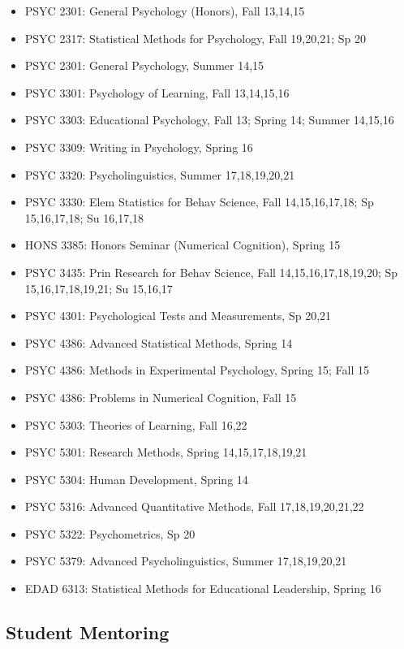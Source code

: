 \documentclass[article,10pt]{article}
\begin{document}
\begin{itemize}
\item PSYC 2301: General Psychology (Honors), Fall 13,14,15
\item PSYC 2317: Statistical Methods for Psychology, Fall 19,20,21; Sp 20
\item PSYC 2301: General Psychology, Summer 14,15
\item PSYC 3301: Psychology of Learning, Fall 13,14,15,16
\item PSYC 3303: Educational Psychology, Fall 13; Spring 14; Summer 14,15,16
\item PSYC 3309: Writing in Psychology, Spring 16
\item PSYC 3320: Psycholinguistics, Summer 17,18,19,20,21
\item PSYC 3330: Elem Statistics for Behav Science, Fall 14,15,16,17,18; Sp 15,16,17,18; Su 16,17,18
\item HONS 3385: Honors Seminar (Numerical Cognition), Spring 15
\item PSYC 3435: Prin Research for Behav Science, Fall 14,15,16,17,18,19,20; Sp 15,16,17,18,19,21; Su 15,16,17
\item PSYC 4301: Psychological Tests and Measurements, Sp 20,21
\item PSYC 4386: Advanced Statistical Methods, Spring 14
\item PSYC 4386: Methods in Experimental Psychology, Spring 15; Fall 15
\item PSYC 4386: Problems in Numerical Cognition, Fall 15
\item PSYC 5303: Theories of Learning, Fall 16,22
\item PSYC 5301: Research Methods, Spring 14,15,17,18,19,21
\item PSYC 5304: Human Development, Spring 14
\item PSYC 5316: Advanced Quantitative Methods, Fall 17,18,19,20,21,22
\item PSYC 5322: Psychometrics, Sp 20
\item PSYC 5379: Advanced Psycholinguistics, Summer 17,18,19,20,21
\item EDAD 6313: Statistical Methods for Educational Leadership, Spring 16
\end{itemize}

\subsection*{Student Mentoring}
\label{sec:org7156e37}
\end{document}
